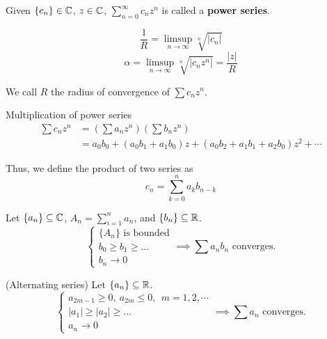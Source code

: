     \begin{defi}
        Given $\{c_n\} \in \mathbb{C}$, $z \in \mathbb{C}$, $\sum_{n=0}^{\infty} c_n z^n$ is called a \textbf{power series}.

        \begin{equation}
            \frac{1}{R} = \limsup_{n \to \infty} \sqrt[n]{|c_n|}
        \end{equation}
        \begin{equation}
            \alpha = \limsup_{n \to \infty} \sqrt[n]{|c_nz^n|} = \frac{|z|}{R}
        \end{equation}

        We call $R$ the radius of convergence of $\sum c_n z^n$.
    \end{defi}

    \begin{theo}
        Multiplication of power series
        \begin{align*}
            \sum c_n z^n 
            &= \left(\sum a_n z^n \right)\left(\sum b_n z^n \right) \\
            &= a_0b_0 + (a_0b_1 + a_1b_0)z + (a_0b_2 + a_1b_1 + a_2b_0)z^2 + \cdots
        \end{align*}

        Thus, we define the product of two series as
        \begin{equation}
            c_n = \sum_{k=0}^n a_kb_{n-k}
        \end{equation}
    \end{theo}

    \begin{theo} Let $\{a_n\} \subseteq \mathbb{C}$, $A_n = \sum_{i=1}^n a_n$, and $\{b_n\} \subseteq \mathbb{R}$.
        \begin{equation}
            \begin{cases}
            \{ A_n \} \text{ is bounded} \\
            b_0 \geq b_1 \geq ... \\
            b_n \to 0
            \end{cases} \implies \sum a_n b_n \text{ converges.}
        \end{equation}
    \end{theo}

    \begin{cor}
        (Alternating series) Let $\{a_n\} \subseteq \mathbb{R}$.
        \begin{equation}
            \begin{cases}
            a_{2m-1} \geq 0, \ a_{2m} \leq 0, \ \ m = 1,2,\cdots \\
            |a_1| \geq |a_2| \geq ... \\
            a_n \to 0
            \end{cases} \implies \sum a_n \text{ converges.}
        \end{equation}
    \end{cor}

